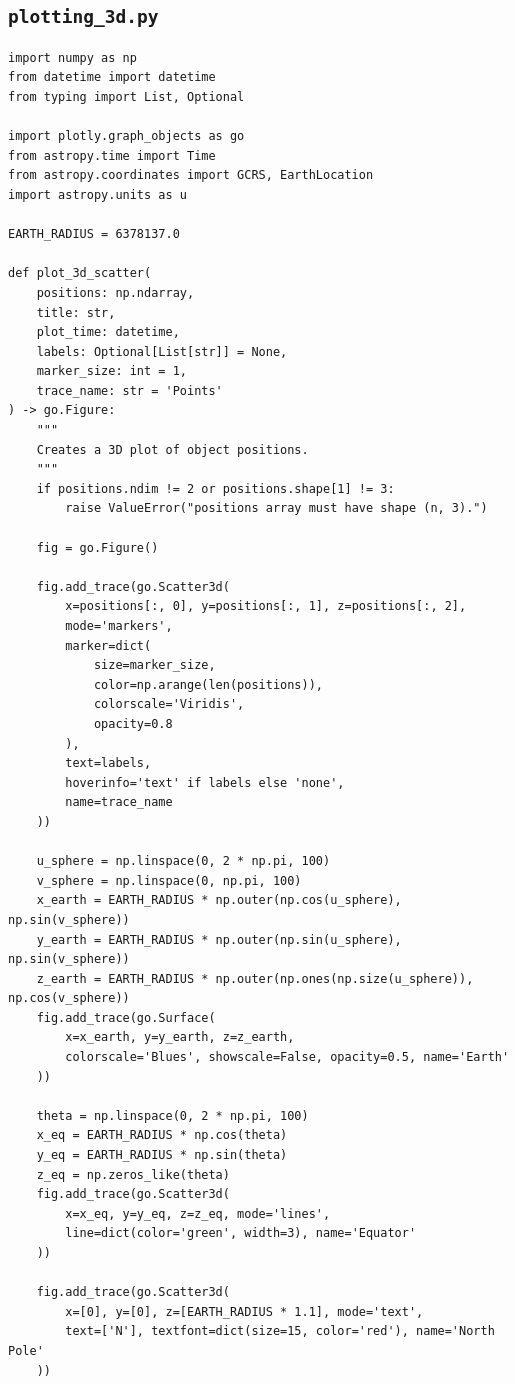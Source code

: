 \documentclass[11pt]{article}
\begin{document}
\subsection{\texttt{plotting\_3d.py}}
\begin{Verbatim}
import numpy as np
from datetime import datetime
from typing import List, Optional

import plotly.graph_objects as go
from astropy.time import Time
from astropy.coordinates import GCRS, EarthLocation
import astropy.units as u

EARTH_RADIUS = 6378137.0

def plot_3d_scatter(
    positions: np.ndarray,
    title: str,
    plot_time: datetime,
    labels: Optional[List[str]] = None,
    marker_size: int = 1,
    trace_name: str = 'Points'
) -> go.Figure:
    """
    Creates a 3D plot of object positions.
    """
    if positions.ndim != 2 or positions.shape[1] != 3:
        raise ValueError("positions array must have shape (n, 3).")

    fig = go.Figure()

    fig.add_trace(go.Scatter3d(
        x=positions[:, 0], y=positions[:, 1], z=positions[:, 2],
        mode='markers',
        marker=dict(
            size=marker_size,
            color=np.arange(len(positions)),
            colorscale='Viridis',
            opacity=0.8
        ),
        text=labels,
        hoverinfo='text' if labels else 'none',
        name=trace_name
    ))

    u_sphere = np.linspace(0, 2 * np.pi, 100)
    v_sphere = np.linspace(0, np.pi, 100)
    x_earth = EARTH_RADIUS * np.outer(np.cos(u_sphere), np.sin(v_sphere))
    y_earth = EARTH_RADIUS * np.outer(np.sin(u_sphere), np.sin(v_sphere))
    z_earth = EARTH_RADIUS * np.outer(np.ones(np.size(u_sphere)), np.cos(v_sphere))
    fig.add_trace(go.Surface(
        x=x_earth, y=y_earth, z=z_earth,
        colorscale='Blues', showscale=False, opacity=0.5, name='Earth'
    ))

    theta = np.linspace(0, 2 * np.pi, 100)
    x_eq = EARTH_RADIUS * np.cos(theta)
    y_eq = EARTH_RADIUS * np.sin(theta)
    z_eq = np.zeros_like(theta)
    fig.add_trace(go.Scatter3d(
        x=x_eq, y=y_eq, z=z_eq, mode='lines',
        line=dict(color='green', width=3), name='Equator'
    ))

    fig.add_trace(go.Scatter3d(
        x=[0], y=[0], z=[EARTH_RADIUS * 1.1], mode='text',
        text=['N'], textfont=dict(size=15, color='red'), name='North Pole'
    ))


\end{Verbatim}
\end{document}
